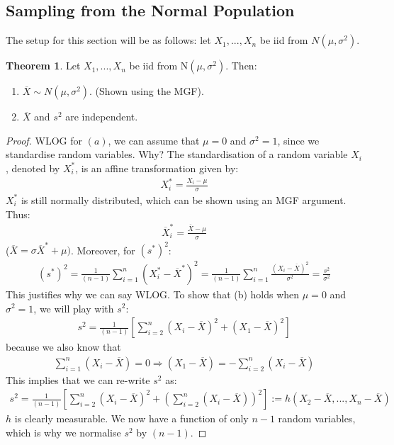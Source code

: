 \documentclass[11pt]{scrartcl}
\theoremstyle{definition}
\newtheorem{theorem}{Theorem}
\theoremstyle{remark}
\begin{document}
{\subsection{Sampling from the Normal Population}

The setup for this section will be as follows: let $X_1, ..., X_n$ be iid from $N( \mu, \sigma^2)$. 

\begin{theorem}
	Let $X_1, ..., X_n$ be iid from N$(\mu, \sigma^2)$. Then: 
	\begin{enumerate}[noitemsep]
		\item $\overline{X} \sim N(\mu, \sigma^2)$. (Shown using the MGF). 
		\item $\overline{X}$ and $s^2$ are independent. 
	\end{enumerate}
\end{theorem}

\begin{proof}
	WLOG for $(a)$, we can assume that $\mu=0$ and $\sigma^2 = 1$, since we standardise random variables. Why? The standardisation of a random variable $X_i$, denoted by $X_i^*$, is an affine transformation given by: 
	\begin{align*}
		X_i^* = \frac{X_i - \mu}{\sigma}	
	\end{align*}
	$X_i^*$ is still normally distributed, which can be shown using an MGF argument. Thus: 
	\begin{align*}
		\overline{X}_i^* = \frac{\overline{X} - \mu}{\sigma}
	\end{align*}
	($\overline{X} = \sigma \overline{X}^* + \mu)$. Moreover, for $(s^*)^2$:  
	\begin{align*}
		(s^*)^2 = \frac{1}{(n-1)	} \sum_{i=1}^n (X_i^* - \overline{X}^*)^2  = \frac{1}{(n-1)} \sum_{i=1}^n \frac{(X_i - \overline{X})^2}{\sigma^2}	= \frac{s^2}{\sigma^2}
	\end{align*}
	This justifies why we can say WLOG. To show that (b) holds when $\mu = 0$ and $\sigma^2 = 1$, we will play with $s^2$: 
	\begin{align*}
		s^2 = \frac{1}{(n-1)} \left[ \sum_{i=2}^n (X_i - \overline{X})^2 + (X_1 - \overline{X})^2  \right] 
	\end{align*}
	because we also know that
	\begin{align*}
		\sum_{i=1}^n (X_i - \overline{X}) = 0 \Rightarrow (X_1 - \overline{X}) = - \sum_{i=2}^n (X_i - \overline{X}) 	
	\end{align*}
	This implies that we can re-write $s^2$ as: 
	\begin{align*}
		s^2 = \frac{1}{(n-1)	} \left[ 	\sum_{i=2}^n (X_i - \overline{X})^2 + \left( 	\sum_{i=2}^n (X_i - \overline{X})	\right)^2 			\right] 	 := h(X_2 - \overline{X}, ..., X_n- \overline{X} )
	\end{align*}
	$h$ is clearly measurable. We now have a function of only $n-1$ random variables, which is why we normalise $s^2$ by $(n-1)$. 
	

\end{proof}}
\end{document}
